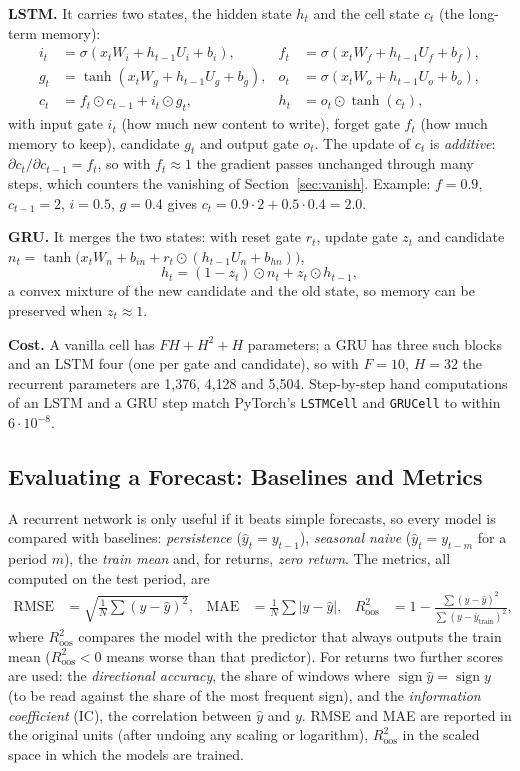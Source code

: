 \documentclass[11pt, a4paper]{article}
\begin{document}
\textbf{LSTM.} It carries two states, the hidden state $h_t$ and the cell state $c_t$ (the long-term memory):
\begin{align}
i_t&=\sigma(x_tW_i+h_{t-1}U_i+b_i), & f_t&=\sigma(x_tW_f+h_{t-1}U_f+b_f), \nonumber\\
g_t&=\tanh(x_tW_g+h_{t-1}U_g+b_g), & o_t&=\sigma(x_tW_o+h_{t-1}U_o+b_o), \nonumber\\
c_t&=f_t\odot c_{t-1}+i_t\odot g_t, & h_t&=o_t\odot\tanh(c_t),
\end{align}
with input gate $i_t$ (how much new content to write), forget gate $f_t$ (how much memory to keep), candidate $g_t$ and output gate $o_t$.
The update of $c_t$ is \emph{additive}: $\partial c_t/\partial c_{t-1}=f_t$, so with $f_t\approx1$ the gradient passes unchanged through many steps, which counters the vanishing of Section~\ref{sec:vanish}.
Example: $f=0.9$, $c_{t-1}=2$, $i=0.5$, $g=0.4$ gives $c_t=0.9\cdot2+0.5\cdot0.4=2.0$.

\textbf{GRU.} It merges the two states: with reset gate $r_t$, update gate $z_t$ and candidate
$n_t=\tanh\!\big(x_tW_n+b_{in}+r_t\odot(h_{t-1}U_n+b_{hn})\big)$,
\begin{equation}
h_t=(1-z_t)\odot n_t+z_t\odot h_{t-1},
\end{equation}
a convex mixture of the new candidate and the old state, so memory can be preserved when $z_t\approx1$.

\textbf{Cost.} A vanilla cell has $FH+H^2+H$ parameters; a GRU has three such blocks and an LSTM four (one per gate and candidate), so with $F=10$, $H=32$ the recurrent parameters are
1{,}376, 4{,}128 and 5{,}504. Step-by-step hand computations of an LSTM and a GRU step match PyTorch's \texttt{LSTMCell} and \texttt{GRUCell} to within $6\cdot10^{-8}$.

\subsection{Evaluating a Forecast: Baselines and Metrics}
\label{sec:eval}

A recurrent network is only useful if it beats simple forecasts, so every model is compared with baselines:
\emph{persistence} ($\hat y_t=y_{t-1}$), \emph{seasonal naive} ($\hat y_t=y_{t-m}$ for a period $m$), the \emph{train mean} and, for returns, \emph{zero return}.
The metrics, all computed on the test period, are
\begin{align}
\mathrm{RMSE}&=\sqrt{\tfrac1N\textstyle\sum(y-\hat y)^2}, & \mathrm{MAE}&=\tfrac1N\textstyle\sum|y-\hat y|, & R^2_{\text{oos}}&=1-\frac{\sum(y-\hat y)^2}{\sum(y-\bar y_{\text{train}})^2},
\end{align}
where $R^2_{\text{oos}}$ compares the model with the predictor that always outputs the train mean ($R^2_{\text{oos}}<0$ means worse than that predictor). For returns two further scores are used:
the \emph{directional accuracy}, the share of windows where $\operatorname{sign}\hat y=\operatorname{sign}y$ (to be read against the share of the most frequent sign), and the
\emph{information coefficient} (IC), the correlation between $\hat y$ and $y$. RMSE and MAE are reported in the original units (after undoing any scaling or logarithm),
$R^2_{\text{oos}}$ in the scaled space in which the models are trained.
\end{document}
